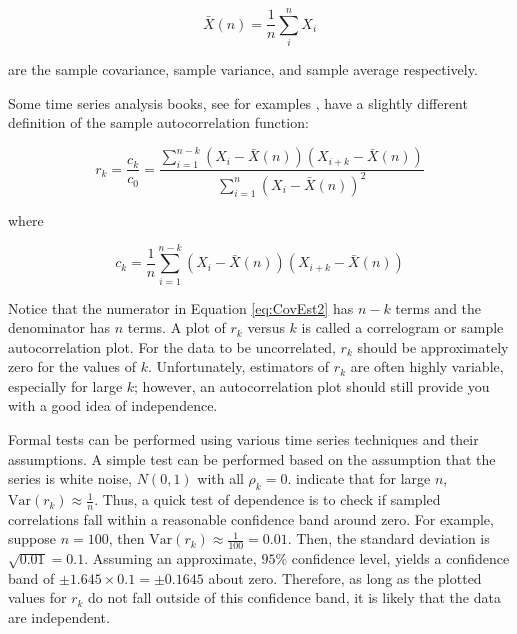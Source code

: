 \documentclass[
]{book}
\theoremstyle{definition}
\theoremstyle{definition}
\theoremstyle{definition}
\theoremstyle{definition}
\theoremstyle{remark}
\begin{document}
\begin{equation}
\bar{X}(n) = \frac{1}{n}\sum\limits_{i}^{n} X_{i}
\label{eq:SampleAvg}
\end{equation}

are the sample covariance, sample variance, and sample average
respectively.

Some time series analysis books, see for examples \citet{box1994forecasting},
have a slightly different definition of the sample autocorrelation
function:

\begin{equation}
r_{k} = \frac{c_{k}}{c_{0}} = \frac{\sum\limits_{i=1}^{n-k}\left(X_{i} - \bar{X}(n) \right)\left(X_{i+k} - \bar{X}(n) \right)}{\sum\limits_{i=1}^{n}\left(X_{i} - \bar{X}(n) \right)^2}
\label{eq:CovEst2}
\end{equation}

where

\begin{equation}
c_{k} = \frac{1}{n}\sum\limits_{i=1}^{n-k}\left(X_{i} - \bar{X}(n) \right)\left(X_{i+k} - \bar{X}(n) \right)
\label{eq:csubk}
\end{equation}

Notice that the numerator in Equation \eqref{eq:CovEst2} has \(n-k\) terms and the denominator has \(n\) terms. A plot of \(r_{k}\) versus \(k\) is called a correlogram or sample
autocorrelation plot. For the data to be uncorrelated, \(r_{k}\) should be
approximately zero for the values of \(k\). Unfortunately, estimators of
\(r_{k}\) are often highly variable, especially for large \(k\); however, an
autocorrelation plot should still provide you with a good idea of
independence.

Formal tests can be performed using various time series techniques and
their assumptions. A simple test can be performed based on the
assumption that the series is white noise, \(N(0,1)\) with all
\(\rho_{k} = 0\). \citet{box1994forecasting} indicate that for large \(n\),
\(\text{Var}(r_{k}) \approx \frac{1}{n}\). Thus, a quick test of
dependence is to check if sampled correlations fall within a reasonable
confidence band around zero. For example, suppose \(n = 100\), then
\(\text{Var}(r_{k}) \approx \frac{1}{100} = 0.01\). Then, the standard
deviation is \(\sqrt{0.01} = 0.1\). Assuming an approximate, \(95\%\)
confidence level, yields a confidence band of
\(\pm 1.645 \times 0.1 = \pm 0.1645\) about zero. Therefore, as long as
the plotted values for \(r_{k}\) do not fall outside of this confidence
band, it is likely that the data are independent.
\end{document}
